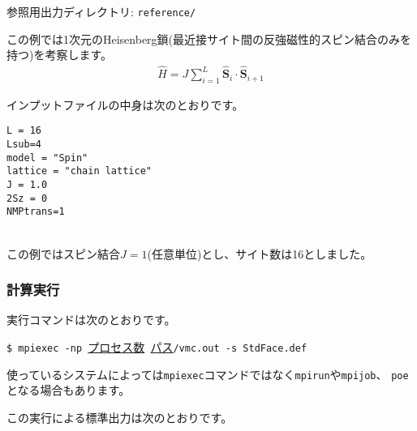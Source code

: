 参照用出力ディレクトリ: \verb|reference/|

この例では1次元のHeisenberg鎖(最近接サイト間の反強磁性的スピン結合のみを持つ)を考察します。
\begin{align}
  {\hat H} = J \sum_{i=1}^{L} {\hat {\boldsymbol S}}_i \cdot {\hat {\boldsymbol S}}_{i+1}
\end{align}

インプットファイルの中身は次のとおりです。
\\
\begin{minipage}{10cm}
\begin{screen}
\begin{verbatim}
L = 16
Lsub=4
model = "Spin"
lattice = "chain lattice"
J = 1.0
2Sz = 0
NMPtrans=1
\end{verbatim}
\end{screen}
\end{minipage}
%
\\
この例ではスピン結合$J=1$(任意単位)とし、サイト数は16としました。

\subsubsection{計算実行}

実行コマンドは次のとおりです。

\verb|$ mpiexec -np |\underline{プロセス数}\verb| |\underline{パス}\verb|/vmc.out -s StdFace.def|

使っているシステムによっては\verb|mpiexec|コマンドではなく\verb|mpirun|や\verb|mpijob|、
\verb|poe|となる場合もあります。

この実行による標準出力は次のとおりです。

